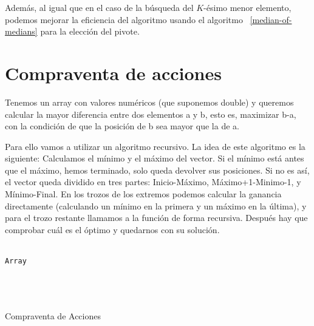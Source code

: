 \documentclass[a4paper, 11pt]{article} %
\begin{document}
Además, al igual que en el caso de la búsqueda del $K$-ésimo menor elemento, podemos mejorar la eficiencia del algoritmo usando el algoritmo ~\ref{median-of-medians} para la elección del pivote.

\section {Compraventa de acciones}
	Tenemos un array con valores numéricos (que suponemos double) y queremos calcular la mayor diferencia entre dos elementos a y b, 
	esto es, maximizar b-a, con la condición de que la posición de b sea mayor que la de a. 
	
	Para ello vamos a utilizar un algoritmo recursivo. La idea de este algoritmo es la siguiente: Calculamos el mínimo y el máximo del 
	vector. Si el mínimo está antes que el máximo, hemos terminado, solo queda devolver sus posiciones. Si no es así, el vector queda 
	dividido en tres partes: Inicio-Máximo, Máximo+1-Minimo-1, y Mínimo-Final. En los trozos de los extremos podemos calcular la ganancia 
	directamente (calculando un mínimo en la primera y un máximo en la última), y para el trozo restante llamamos a la función de forma 
	recursiva. Después hay que comprobar cuál es el óptimo y quedarnos con su solución. 
	
	

\begin{algorithm}[H]
	\begin{algorithmic}[1]
		\REQUIRE \ \\
        	\texttt{Array}\\\
     	\ELSE
     		\ENDIF \\\
     		\ELSE
    	\ENDIF \\\
	\end{algorithmic}
    \caption{Compraventa de Acciones}
    \label{algoritmo}
\end{algorithm}
\end{document}
